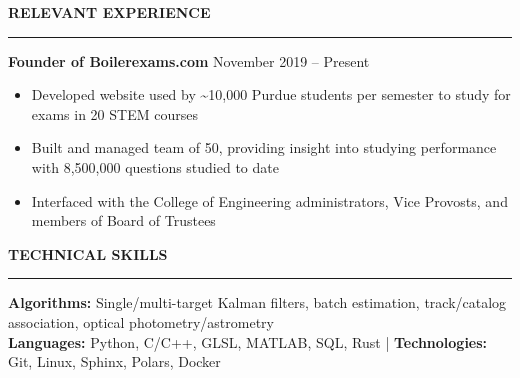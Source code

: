 \documentclass[10pt, a4paper]{article}
\newcommand{\sectiontitle}[1]{{\Large \textbf{#1}}\vspace{0.5em}\hrule\vspace{0.5em}}
\begin{document}
\sectiontitle{RELEVANT EXPERIENCE}
\textbf{Founder of Boilerexams.com} \hfill November 2019 -- Present
\begin{itemize}[noitemsep]
    \item Developed website used by \textasciitilde10,000 Purdue students per semester to study for exams in 20 STEM courses
    \item Built and managed team of 50, providing insight into studying performance with 8,500,000 questions studied to date
    \item Interfaced with the College of Engineering administrators, Vice Provosts, and members of Board of Trustees
\end{itemize}

\sectiontitle{TECHNICAL SKILLS}
\textbf{Algorithms:} Single/multi-target Kalman filters, batch estimation, track/catalog association, optical photometry/astrometry \\
\textbf{Languages:} Python, C/C++, GLSL, MATLAB, SQL, Rust | \textbf{Technologies:} Git, Linux, Sphinx, Polars, Docker \\
\end{document}
